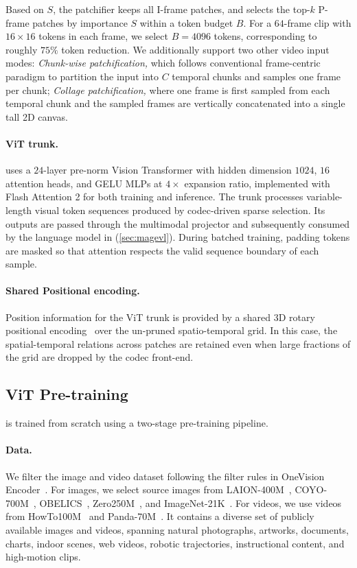 Based on $S$, the patchifier keeps all I-frame patches, and selects the top-$k$ P-frame patches by importance $S$ within a token budget $B$. For a $64$-frame clip with $16\times16$ tokens in each frame, we select $B=4096$ tokens, corresponding to roughly $75\%$ token reduction. We additionally support two other video input modes: \textit{Chunk-wise patchification,} which follows conventional frame-centric paradigm to partition the input into $C$ temporal chunks and samples one frame per chunk; \textit{Collage patchification,} where one frame is first sampled from each temporal chunk and the sampled frames are vertically concatenated into a single tall 2D canvas. 


\paragraph{ViT trunk.} \magevit uses a $24$-layer pre-norm Vision Transformer with hidden dimension $1024$, $16$ attention heads, and GELU MLPs at $4{\times}$ expansion ratio, implemented with Flash Attention 2 \cite{dao2023flashattention2} for both training and inference. The trunk processes variable-length visual token sequences produced by codec-driven sparse selection. Its outputs are passed through the multimodal projector and subsequently consumed by the language model in \magevl (\cref{sec:magevl}). During batched training, padding tokens are masked so that attention respects the valid sequence boundary of each sample.

\paragraph{Shared Positional encoding.} Position information for the ViT trunk is provided by a shared 3D rotary positional encoding~\citep{su2024rope} over the un-pruned spatio-temporal grid.  In this case, the spatial-temporal relations across patches are retained even when large fractions of the grid are dropped by the codec front-end.

\subsection{ViT Pre-training}
\label{sec:magevit_training}

\magevit is trained from scratch using a two-stage pre-training pipeline.

\paragraph{Data.} We filter the image and video dataset following the filter rules in OneVision Encoder~\citep{ovencoder2026}. For images, we select source images from LAION-400M~\citep{schuhmann2021laion}, COYO-700M~\citep{byeon2022coyo}, OBELICS~\citep{laurenccon2023obelics}, Zero250M~\citep{xie2023ccmb}, and ImageNet-21K~\citep{deng2009imagenet}. For videos, we use videos from HowTo100M~\citep{miech2019howto100m} and Panda-70M~\citep{chen2024panda70m}. It contains a diverse set of publicly available images and videos, spanning natural photographs, artworks, documents, charts, indoor scenes, web videos, robotic trajectories, instructional content, and high-motion clips.


